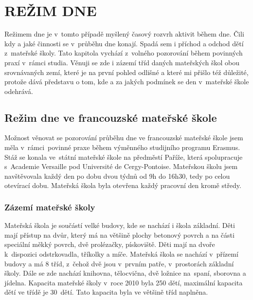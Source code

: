 \chapter{REŽIM DNE}
\label{kap:rezim}
	Režimem dne je v tomto případě myšlený časový rozvrh aktivit během dne. Čili kdy a jaké činnosti se v průběhu dne konají. Spadá sem i příchod a odchod dětí z mateřské školy. Tato kapitola vychází z volného pozorování během povinných praxí v rámci studia. Věnuji se zde i zázemí tříd daných mateřských škol obou srovnávaných zemí, které je na první pohled odlišné a které mi přišlo též důležité, protože dává představu o tom, kde a za jakých podmínek se den v mateřské škole odehrává. 

	\section{Režim dne ve francouzské mateřské škole}

		Možnost věnovat se pozorování průběhu dne ve francouzské mateřské škole jsem měla v rámci povinné praxe během výměnného studijního programu Erasmus. Stáž se konala ve státní mateřské škole na předměstí Paříže, která spolupracuje s Academie Versaille pod Université de Cergy-Pontoise. Mateřskou školu jsem navštěvovala každý den po dobu dvou týdnů od 9h do 16h30, tedy po celou otevírací dobu. Mateřská škola byla otevřena každý pracovní den kromě středy. 

		\subsection{Zázemí mateřské školy}

			Mateřská škola je součástí velké budovy, kde se nachází i škola základní. Děti mají přístup na dvůr, který má na většině plochy betonový povrch a na části speciální měkký povrch, dvě prolézačky, pískoviště. Děti mají na dvoře k dispozici odstrkovadla, tříkolky a míče. 
			Mateřská škola se nachází v přízemí budovy a má 8 tříd, z čehož dvě jsou v prvním patře, v prostorách 	základní školy. Dále se zde nachází knihovna, tělocvična, dvě ložnice na spaní, sborovna a jídelna. 
			Kapacita mateřské školy v roce 2010 byla 250 dětí, maximální kapacita dětí ve třídě je 30 dětí. Tato kapacita byla ve většině tříd naplněna.

